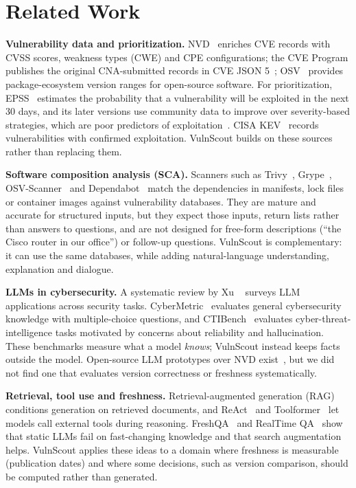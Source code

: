 \documentclass[final]{cvpr}
\begin{document}
\section{Related Work}
\label{sec:related}

\textbf{Vulnerability data and prioritization.} NVD~\cite{nvd} enriches CVE records with CVSS scores, weakness types (CWE) and CPE configurations; the CVE Program publishes the original CNA-submitted records in CVE JSON 5~\cite{cvelistv5}; OSV~\cite{osv} provides package-ecosystem version ranges for open-source software. For prioritization, EPSS~\cite{jacobs2019epss} estimates the probability that a vulnerability will be exploited in the next 30 days, and its later versions use community data to improve over severity-based strategies, which are poor predictors of exploitation~\cite{jacobs2023epss}. CISA KEV~\cite{cisakev} records vulnerabilities with confirmed exploitation. VulnScout builds on these sources rather than replacing them.

\textbf{Software composition analysis (SCA).} Scanners such as Trivy~\cite{trivy}, Grype~\cite{grype}, OSV-Scanner~\cite{osvscanner} and Dependabot~\cite{dependabot} match the dependencies in manifests, lock files or container images against vulnerability databases. They are mature and accurate for structured inputs, but they expect those inputs, return lists rather than answers to questions, and are not designed for free-form descriptions (``the Cisco router in our office'') or follow-up questions. VulnScout is complementary: it can use the same databases, while adding natural-language understanding, explanation and dialogue.

\textbf{LLMs in cybersecurity.} A systematic review by Xu \etal~\cite{xu2024llmsecurity} surveys LLM applications across security tasks. CyberMetric~\cite{tihanyi2024cybermetric} evaluates general cybersecurity knowledge with multiple-choice questions, and CTIBench~\cite{alam2024ctibench} evaluates cyber-threat-intelligence tasks motivated by concerns about reliability and hallucination. These benchmarks measure what a model \emph{knows}; VulnScout instead keeps facts outside the model. Open-source LLM prototypes over NVD exist~\cite{nvdchatbot,cvellmdataset}, but we did not find one that evaluates version correctness or freshness systematically.

\textbf{Retrieval, tool use and freshness.} Retrieval-augmented generation (RAG)~\cite{lewis2020rag} conditions generation on retrieved documents, and ReAct~\cite{yao2023react} and Toolformer~\cite{schick2023toolformer} let models call external tools during reasoning. FreshQA~\cite{vu2023freshllms} and RealTime QA~\cite{kasai2022realtimeqa} show that static LLMs fail on fast-changing knowledge and that search augmentation helps. VulnScout applies these ideas to a domain where freshness is measurable (publication dates) and where some decisions, such as version comparison, should be computed rather than generated.
\end{document}
